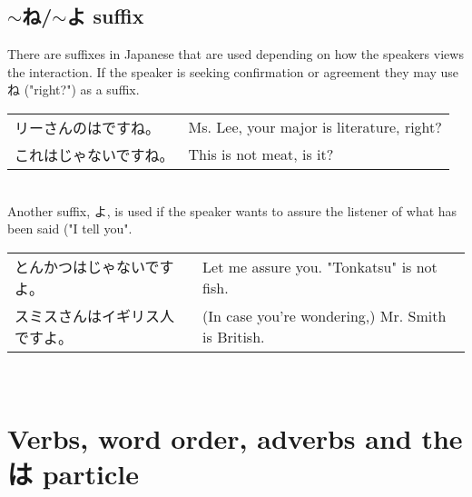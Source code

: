\documentclass{article}
\newenvironment{gex}
{
	\,\\
	\renewcommand{\arraystretch}{1.5}
    \begin{tabular}{m{20em} l}
}
{
	\end{tabular}
	\renewcommand{\arraystretch}{1}
	\\
}
\begin{document}
   \subsection{$\sim$ね/$\sim$よ suffix}
   There are suffixes in Japanese that are used depending on how the speakers views the interaction. If the speaker is seeking confirmation or agreement they may use ね ("right?") as a suffix.
   \begin{gex}
   リーさんの\ruby{選考}{せんこう}は\ruby{文学}{ぶんがく}ですね。 & Ms. Lee, your major is literature, right? \\
   これは\ruby{肉}{にく}じゃないですね。 & This is not meat, is it?
   \end{gex}   
   Another suffix, よ, is used if the speaker wants to assure the listener of what has been said ("I tell you". 
   \begin{gex}
   とんかつは\ruby{魚}{さかな}じゃないですよ。 & Let me assure you. "Tonkatsu" is not fish. \\
   スミスさんはイギリス人ですよ。 & (In case you're wondering,) Mr. Smith is British.
   \end{gex}
   
   
   
   \newpage
   
   \section{Verbs, word order, adverbs and the は particle}
\end{document}
